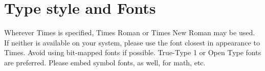 \documentclass[10pt, conference, compsocconf]{IEEEtran}
\begin{document}
\section{Type style and Fonts}
Wherever Times is specified, Times Roman or Times New Roman may be used. If neither is available on your system, please use the font closest in appearance to Times. Avoid using bit-mapped fonts if possible. True-Type 1 or Open Type fonts are preferred. Please embed symbol fonts, as well, for math, etc.


%
%



%
%
\end{document}
